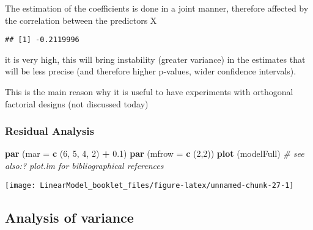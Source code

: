 \documentclass[
]{article}
\newenvironment{Shaded}{\begin{snugshade}}{\end{snugshade}}
\newcommand{\CommentTok}[1]{\textcolor[rgb]{0.56,0.35,0.01}{\textit{#1}}}
\newcommand{\DataTypeTok}[1]{\textcolor[rgb]{0.13,0.29,0.53}{#1}}
\newcommand{\DecValTok}[1]{\textcolor[rgb]{0.00,0.00,0.81}{#1}}
\newcommand{\FloatTok}[1]{\textcolor[rgb]{0.00,0.00,0.81}{#1}}
\newcommand{\KeywordTok}[1]{\textcolor[rgb]{0.13,0.29,0.53}{\textbf{#1}}}
\newcommand{\NormalTok}[1]{#1}
\newcommand{\OperatorTok}[1]{\textcolor[rgb]{0.81,0.36,0.00}{\textbf{#1}}}
\newcommand{\StringTok}[1]{\textcolor[rgb]{0.31,0.60,0.02}{#1}}
\begin{document}
The estimation of the coefficients is done in a joint manner, therefore
affected by the correlation between the predictors X

\begin{Shaded}
\end{Shaded}

\begin{verbatim}
## [1] -0.2119996
\end{verbatim}

it is very high, this will bring instability (greater variance) in the
estimates that will be less precise (and therefore higher p-values,
wider confidence intervals).

This is the main reason why it is useful to have experiments with
orthogonal factorial designs (not discussed today)

\hypertarget{residual-analysis}{%
\subsubsection{Residual Analysis}\label{residual-analysis}}

\begin{Shaded}
\begin{Highlighting}[]
\KeywordTok{par}\NormalTok{ (}\DataTypeTok{mar =} \KeywordTok{c}\NormalTok{ (}\DecValTok{6}\NormalTok{, }\DecValTok{5}\NormalTok{, }\DecValTok{4}\NormalTok{, }\DecValTok{2}\NormalTok{) }\OperatorTok{+}\StringTok{ }\FloatTok{0.1}\NormalTok{)}
\KeywordTok{par}\NormalTok{ (}\DataTypeTok{mfrow =} \KeywordTok{c}\NormalTok{ (}\DecValTok{2}\NormalTok{,}\DecValTok{2}\NormalTok{))}
\KeywordTok{plot}\NormalTok{ (modelFull) }\CommentTok{# see also:? plot.lm for bibliographical references}
\end{Highlighting}
\end{Shaded}

\begin{center}\texttt{[image: LinearModel\_booklet\_files/figure-latex/unnamed-chunk-27-1]} \end{center}

\hypertarget{analysis-of-variance}{%
\subsection{Analysis of variance}\label{analysis-of-variance}}
\end{document}
